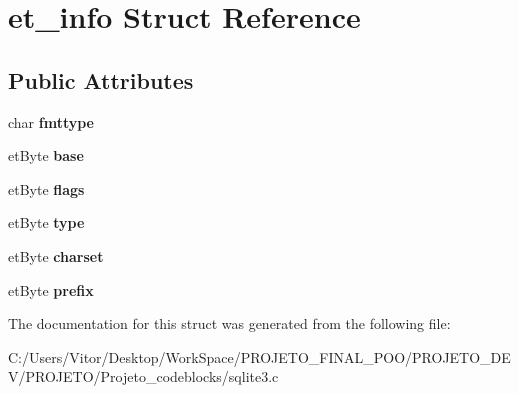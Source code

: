 \hypertarget{structet__info}{\section{et\-\_\-info Struct Reference}
\label{structet__info}
}
\subsection*{Public Attributes}
\begin{DoxyCompactItemize}
\item 
\hypertarget{structet__info_a1740af27f0c9d5840e7dda59a129aa4b}{char {\bfseries fmttype}}\label{structet__info_a1740af27f0c9d5840e7dda59a129aa4b}

\item 
\hypertarget{structet__info_a20f5a4c11c7aa1d9c777805d11965c66}{et\-Byte {\bfseries base}}\label{structet__info_a20f5a4c11c7aa1d9c777805d11965c66}

\item 
\hypertarget{structet__info_a8f11646aaec803f0870683dc3ba2f756}{et\-Byte {\bfseries flags}}\label{structet__info_a8f11646aaec803f0870683dc3ba2f756}

\item 
\hypertarget{structet__info_a148bd1efa49018c9a723701ba5747825}{et\-Byte {\bfseries type}}\label{structet__info_a148bd1efa49018c9a723701ba5747825}

\item 
\hypertarget{structet__info_a77131acb7479b0e6aad61af0901e11c2}{et\-Byte {\bfseries charset}}\label{structet__info_a77131acb7479b0e6aad61af0901e11c2}

\item 
\hypertarget{structet__info_a23cc866bf202c34e49bd49599b051628}{et\-Byte {\bfseries prefix}}\label{structet__info_a23cc866bf202c34e49bd49599b051628}

\end{DoxyCompactItemize}


The documentation for this struct was generated from the following file\-:\begin{DoxyCompactItemize}
\item 
C\-:/\-Users/\-Vitor/\-Desktop/\-Work\-Space/\-P\-R\-O\-J\-E\-T\-O\-\_\-\-F\-I\-N\-A\-L\-\_\-\-P\-O\-O/\-P\-R\-O\-J\-E\-T\-O\-\_\-\-D\-E\-V/\-P\-R\-O\-J\-E\-T\-O/\-Projeto\-\_\-codeblocks/sqlite3.\-c\end{DoxyCompactItemize}
